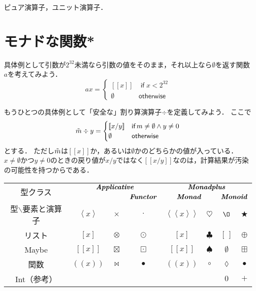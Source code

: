 \documentclass[a5paper,draft]{jsbook}
\def\[{\left[\!\left[}
\def\]{\right]\!\right]}
\def\({\left(\!\left(}
\def\){\right)\!\right)}
\newcommand{\mathTypeClass}[1]{\textbf{\emph{#1}}} %
\newcommand{\mathMaybeVar}[1]{\Tilde{#1}}
\newcommand{\mathListWith}[1]{\left[#1\right]}
\newcommand{\mathMaybeWith}[1]{\[#1\]}
\newcommand{\mathPureWith}[1]{\left\langle#1\right\rangle}
\newcommand{\mathUnitWith}[1]{\left\langle\!\left\langle#1\right\rangle\!\right\rangle}
\newcommand{\mathId}{\O}
\newcommand{\mathEmptyList}{{[\,]}}
\newcommand{\mathNothing}{\emptyset}
\newcommand{\mathAnonymousParameter}{\lozenge}
\newcommand{\mathAnyBinaryOperator}{\mathbin{\bigstar}}
\newcommand{\mathAnd}{\mathbin{\wedge}}
\newcommand{\mathAppend}{\oplus}
\newcommand{\mathApplicativeGeneralMap}{\mathbin{\times}}
\newcommand{\mathApplicativeMap}{\mathbin{\otimes}}
\newcommand{\mathApplicativeMaybeMap}{\mathbin{\boxtimes}}
\newcommand{\mathCompose}{\mathbin{\bullet}}
\newcommand{\mathGeneralMap}{\mathbin{\cdot}}
\newcommand{\mathMap}{\mathbin{\odot}}
\newcommand{\mathMaybeMap}{\mathbin{\boxdot}}
\newcommand{\mathKeyword}[1]{\operatorname{\textsf{#1}}}
\newcommand{\mathIf}{\mathKeyword{if}}
\newcommand{\mathOtherwise}{\mathKeyword{otherwise}}
\DeclareMathOperator{\hsklMaybeAppend}{{DO NOT USE}--\boxplus}
\DeclareMathOperator{\hsklMonadMap}{{DO NOT USE}--\heartsuit}
\begin{document}
ピュア演算子，ユニット演算子．


\section{モナドな関数*}


具体例として引数が$2^{32}$未満なら引数の値をそのまま，それ以上なら$\mathNothing$を返す関数$a$を考えてみよう．
\begin{equation}
ax=\begin{cases}
\mathMaybeWith{x}&\mathIf x<2^{32}\\
\mathNothing&\mathOtherwise
\end{cases}
\end{equation}


もうひとつの具体例として「安全な」割り算演算子$\div$を定義してみよう．
ここで
\begin{equation}
\mathMaybeVar{m}\div y=\begin{cases}\mathMaybeWith{x/y}&\mathIf m\neq\mathNothing\mathAnd y\neq0\\
\mathNothing&\mathOtherwise\end{cases}
\end{equation}
とする．
ただし$\mathMaybeVar{m}$は$\mathMaybeWith{x}$か，あるいは$\mathNothing$かのどちらかの値が入っている．
$x\neq\mathNothing$かつ$y\neq0$のときの戻り値が$x/y$ではなく$\mathMaybeWith{x/y}$なのは，計算結果が汚染の可能性を持つからである．


\begin{table*}
\begin{center}
\begin{tabular}{||c||c|c|c|c|c|c|c||}
\hline
\multirow{2}{*}{型クラス}
    &\multicolumn{3}{|c|}{$\mathTypeClass{Applicative}$}
    &\multicolumn{4}{|c||}{$\mathTypeClass{Monadplus}$}\\
\cline{4-8}
\multirow{1}{*}{}
    &\multicolumn{2}{|c|}{ }
    &$\mathTypeClass{Functor}$
    &\multicolumn{2}{|c}{$\mathTypeClass{Monad}$}
    &\multicolumn{2}{|c||}{$\mathTypeClass{Monoid}$}\\
\hline\hline
型$\backslash$要素と演算子
    &$\mathPureWith{x}$
    &$\mathApplicativeGeneralMap$
    &$\mathGeneralMap$
    &$\mathUnitWith{x}$
    &$\heartsuit$%
    &$\mathId$
    &$\mathAnyBinaryOperator$\\
\hline
リスト
    &$[x]$
    &$\mathApplicativeMap$
    &$\mathMap$
    &$\mathListWith{x}$
    &$\clubsuit$
    &$\mathEmptyList$
    &$\mathAppend$\\
\hline
Maybe
    &$\mathMaybeWith{x}$
    &$\mathApplicativeMaybeMap$
    &$\mathMaybeMap$
    &$\mathMaybeWith{x}$
    &$\spadesuit$
    &$\mathNothing$
    &$\boxplus$\\%
\hline
関数
    &$\(x\)$
    &$\bowtie$
    &$\mathCompose$
    &$\(x\)$
    &$\circ$
    &$\mathAnonymousParameter$
    &$\mathCompose$\\
\hline
Int（参考）
    &
    &
    &
    &
    &
    &$0$
    &$+$\\
\hline
\end{tabular}
\end{center}
\end{table*}
\end{document}
